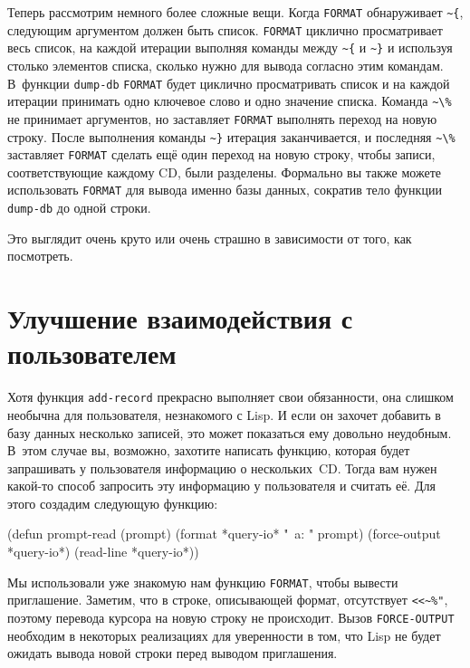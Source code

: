 Теперь рассмотрим немного более сложные вещи. Когда \lstinline{FORMAT} обнаруживает
\lstinline!~{!, следующим аргументом должен быть список. \lstinline{FORMAT} циклично
  просматривает весь список, на каждой итерации выполняя команды между \lstinline!~{! и
    \lstinline!~}! и используя столько элементов списка, сколько нужно для вывода согласно
  этим командам. В~функции \lstinline{dump-db} \lstinline{FORMAT} будет циклично просматривать
  список и на каждой итерации принимать одно ключевое слово и одно значение
  списка. Команда \lstinline!~\%! не принимает аргументов, но заставляет \lstinline{FORMAT}
  выполнять переход на новую строку. После выполнения команды \lstinline!~}! итерация
заканчивается, и последняя \lstinline!~\%! заставляет \lstinline{FORMAT} сделать ещё один
переход на новую строку, чтобы записи, соответствующие каждому CD, были разделены.
Формально вы также можете использовать \lstinline{FORMAT} для вывода именно базы данных,
сократив тело функции \lstinline{dump-db} до одной строки.


Это выглядит очень круто или очень страшно в зависимости от того, как посмотреть.

\section{Улучшение взаимодействия с пользователем}

Хотя функция \lstinline{add-record} прекрасно выполняет свои обязанности, она слишком необычна
для пользователя, незнакомого с Lisp. И если он захочет добавить в базу данных несколько
записей, это может показаться ему довольно неудобным. В~этом случае вы, возможно, захотите
написать функцию, которая будет запрашивать у пользователя информацию о нескольких~CD.
Тогда вам нужен какой-то способ запросить эту информацию у пользователя и считать её. Для
этого создадим следующую функцию:

\begin{myverb}
(defun prompt-read (prompt)
 (format *query-io* "~a: " prompt)
 (force-output *query-io*)
 (read-line *query-io*))
\end{myverb}

Мы использовали уже знакомую нам функцию \lstinline{FORMAT}, чтобы вывести
приглашение. Заметим, что в строке, описывающей формат, отсутствует \lstinline{<<~%"},
поэтому перевода курсора на новую строку не происходит. Вызов \lstinline{FORCE-OUTPUT}
необходим в некоторых реализациях для уверенности в том, что Lisp не будет ожидать вывода
новой строки перед выводом приглашения.

